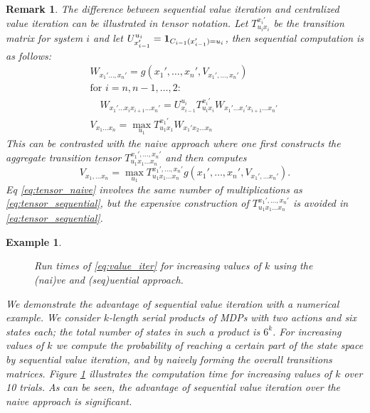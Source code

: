 \documentclass[conference]{IEEEtran}
\newlength\figureheight
\newlength\figurewidth
\newtheorem{remark}{Remark}
\newtheorem{example}{Example}
\begin{document}
\begin{remark}
  The difference between sequential value iteration and centralized value iteration can be illustrated in tensor notation. Let $T_{u_i x_i}^{x_i'}$ be the transition matrix for system $i$ and let $U_{x'_{i-1}}^{u_i} = \mathbf{1}_{C_{i-1}(x'_{i-1}) = u_i}$, then sequential computation is as follows:
  \begin{equation}
  \label{eq:tensor_sequential}
  \begin{aligned}
      & W_{x_1' \ldots, x_n'} = g(x_1', \ldots, x_n', V_{x_1', \ldots, x_n'}) \\
      & \text{for $i = n, n-1, \ldots, 2$}: \\
      & \quad W_{x_1'\ldots x_i x_{i+1} \ldots x_n'} = U_{x_{i-1}}^{u_i} T_{u_i x_i}^{x_i'}  W_{x_1'\ldots x_i' x_{i+1} \ldots x_n'} \quad \\
      & V_{x_1\ldots x_n} = \max_{u_1} T^{x_1'}_{u_1x_1} W_{x_1' x_2 \ldots x_n}
  \end{aligned}
  \end{equation}
  This can be contrasted with the naive approach where one first constructs the aggregate transition tensor $T_{u_1 x_1 \ldots x_n}^{x_1', \ldots, x_n'}$ and then computes
  \begin{equation}
  \label{eq:tensor_naive}
    V_{x_1, \ldots x_n} = \max_{u_1} T_{u_1 x_1 \ldots x_n}^{x_1', \ldots, x_n'} g(x_1', \ldots, x_n', V_{x_1', \ldots x_n'}).
  \end{equation}
  Eq \eqref{eq:tensor_naive} involves the same number of multiplications as \eqref{eq:tensor_sequential}, but the expensive construction of $T_{u_1 x_1 \ldots x_n}^{x_1', \ldots, x_n'}$ is avoided in \eqref{eq:tensor_sequential}.
\end{remark}

\begin{example}
  \begin{figure}[h]
    \setlength{} 
    \setlength{} 
    
    \caption{Run times of \eqref{eq:value_iter} for increasing values of $k$ using the (nai)ve and (seq)uential approach.}
    \label{fig:scalability}
  \end{figure}
  We demonstrate the advantage of sequential value iteration with a numerical example. We consider $k$-length serial products of MDPs with two actions and six states each; the total number of states in such a product is $6^k$. For increasing values of $k$ we compute the probability of reaching a certain part of the state space by sequential value iteration, and by naively forming the overall transitions matrices. Figure \ref{fig:scalability} illustrates the computation time for increasing values of $k$ over 10 trials. As can be seen, the advantage of sequential value iteration over the naive approach is significant.
\end{example}
\end{document}
